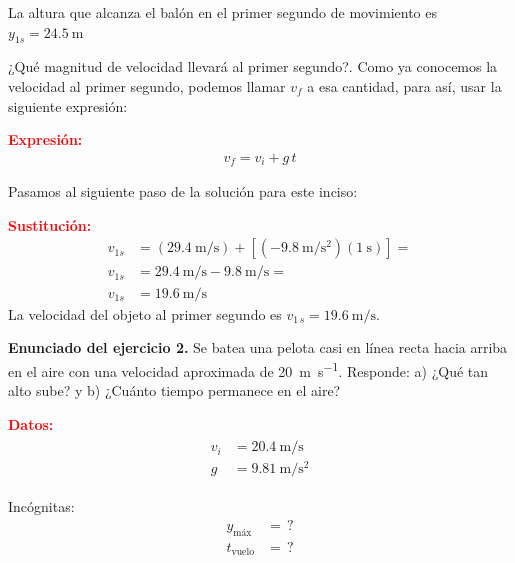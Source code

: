 \documentclass[14pt]{extarticle}
\newcommand{\textocolor}[2]{\textbf{\textcolor{#1}{#2}}}
\begin{document}
La altura que alcanza el balón en el primer segundo de movimiento es $y_{1 s} = \SI{24.5}{\meter}$

\vspace*{0.5cm}
¿Qué magnitud de velocidad llevará al primer segundo?. Como ya conocemos la velocidad al primer segundo, podemos llamar $v_{f}$ a esa cantidad, para así, usar la siguiente expresión:

\vspace*{0.5cm}
\textocolor{red}{Expresión:}
\begin{align*}
v_{f} = v_{i} + g \, t
\end{align*}

Pasamos al siguiente paso de la solución para este inciso:

\vspace*{0.5cm}
\textocolor{red}{Sustitución:}
\begin{align*}
v_{1 s} &= \left( \SI[per-mode=fraction]{29.4}{\meter\per\second}\right) + \left[ \displaystyle \left( - \SI[per-mode=fraction]{9.8}{\meter\per\square\second} \right) (\SI{1}{\second}) \right] = \\[0.5em]
v_{1 s} &= \SI[per-mode=fraction]{29.4}{\meter\per\second} - \SI[per-mode=fraction]{9.8}{\meter\per\second} = \\[0.5em]
v_{1 s} &= \SI[per-mode=fraction]{19.6}{\meter\per\second}
\end{align*}
La velocidad del objeto al primer segundo es $v_{1 \, s} = \SI{19.6}{\meter\per\second}$.

\vspace*{0.5cm}
\noindent
\textbf{Enunciado del ejercicio 2.}  Se batea una pelota casi en línea recta hacia arriba en el aire con una velocidad aproximada de \SI{20}{\meter\per\second}. Responde: a) ¿Qué tan alto sube? y b) ¿Cuánto tiempo permanece en el aire?

\vspace*{0.5cm}
\begin{minipage}[t]{0.3\linewidth}
\textocolor{red}{Datos:}
\begin{eqnarray*}
\begin{aligned}
v_{i} &= \SI{20.4}{\meter\per\second} \\
g &= \SI{9.81}{\meter\per\square\second}
\end{aligned}
\end{eqnarray*}
\end{minipage}
\hspace{1cm}
\begin{minipage}[t]{0.4\linewidth}
Incógnitas:
\begin{align*}
y_{\text{máx}} &= \, ? \\
t_{\text{vuelo}} &= \, ?
\end{align*}
\end{minipage}
\end{document}
